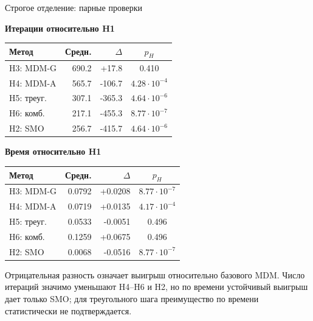 \SPBGContentSlide
  {Строгое отделение: парные проверки}
  {%
    \centering
    \TinyBody
    \renewcommand{\arraystretch}{1.10}
    \setlength{\tabcolsep}{3.4pt}
    \begin{minipage}[t]{.48\linewidth}
      \centering
      \textbf{Итерации относительно H1}\par\vspace{3pt}
      \begin{tabular}{|l|r|r|c|}
        \hline
        \textbf{Метод} & \textbf{Средн.} & \textbf{$\Delta$} & \textbf{$p_H$} \\
        \hline
        H3: MDM-G & 690.2 & +17.8 & 0.410 \\
        \hline
        H4: MDM-A & 565.7 & -106.7 & $4.28\cdot10^{-4}$ \\
        \hline
        H5: треуг. & 307.1 & -365.3 & $4.64\cdot10^{-6}$ \\
        \hline
        H6: комб. & 217.1 & -455.3 & $8.77\cdot10^{-7}$ \\
        \hline
        H2: SMO & 256.7 & -415.7 & $4.64\cdot10^{-6}$ \\
        \hline
      \end{tabular}
    \end{minipage}\hfill
    \begin{minipage}[t]{.48\linewidth}
      \centering
      \textbf{Время относительно H1}\par\vspace{3pt}
      \begin{tabular}{|l|r|r|c|}
        \hline
        \textbf{Метод} & \textbf{Средн.} & \textbf{$\Delta$} & \textbf{$p_H$} \\
        \hline
        H3: MDM-G & 0.0792 & +0.0208 & $8.77\cdot10^{-7}$ \\
        \hline
        H4: MDM-A & 0.0719 & +0.0135 & $4.17\cdot10^{-4}$ \\
        \hline
        H5: треуг. & 0.0533 & -0.0051 & 0.496 \\
        \hline
        H6: комб. & 0.1259 & +0.0675 & 0.496 \\
        \hline
        H2: SMO & 0.0068 & -0.0516 & $8.77\cdot10^{-7}$ \\
        \hline
      \end{tabular}
    \end{minipage}

    \vspace{.18cm}
    \begin{minipage}{.90\linewidth}
      \SmallBody
      \raggedright
      Отрицательная разность означает выигрыш относительно базового MDM. Число
      итераций значимо уменьшают H4--H6 и H2, но по времени устойчивый выигрыш
      дает только SMO; для треугольного шага преимущество по времени статистически
      не подтверждается.
    \end{minipage}
  }
